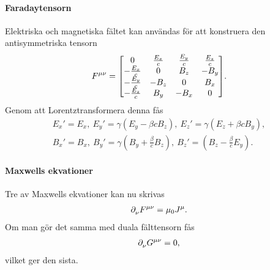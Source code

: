 \paragraph{Faradaytensorn}
Elektriska och magnetiska fältet kan användas för att konstruera den antisymmetriska tensorn
\begin{align*}
	F^{\mu\nu} = 
	\mqty
	[
		0                & \frac{E_{x}}{c} & \frac{E_{y}}{c} & \frac{E_{z}}{c} \\
		-\frac{E_{x}}{c} & 0               & B_{z}           & -B_{y} \\
		-\frac{E_{y}}{c} & -B_{z}          & 0               & B_{x}  \\
		-\frac{E_{z}}{c} & B_{y}           & -B_{x}          & 0
	].
\end{align*}
Genom att Lorentztransformera denna fås
\begin{align*}
	E_{x}' = E_{x},\ E_{y}' = \gamma(E_{y} - \beta cB_{z}),\ E_{z}' = \gamma(E_{z} + \beta cB_{y}), \\
	B_{x}' = B_{x},\ B_{y}' = \gamma\left(B_{y} + \frac{\beta}{c}B_{z}\right),\ B_{z}' = \left(B_{z} - \frac{\beta}{c}E_{y}\right).
\end{align*}


\paragraph{Maxwells ekvationer}
Tre av Maxwells ekvationer kan nu skrivas
\begin{align*}
	\partial_{\nu}^{}F^{\mu\nu} = \mu_{0}J^{\mu}.
\end{align*}
Om man gör det samma med duala fälttensorn fås
\begin{align*}
	\partial_{\nu}^{}G^{\mu\nu} = 0,
\end{align*}
vilket ger den sista.